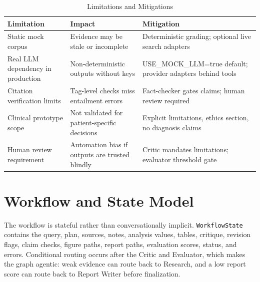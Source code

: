 \documentclass[11pt]{article}
\begin{document}
\begin{table}[!htbp]
\centering
\caption{Limitations and Mitigations}
\label{tab:state-table-5}
\begingroup
\footnotesize
\setlength{\tabcolsep}{2.8pt}
\renewcommand{\arraystretch}{1.35}
\begin{adjustbox}{max width=\textwidth}
\begin{tabularx}{\textwidth}{@{}>{\RaggedRight\arraybackslash}p{}>{\RaggedRight\arraybackslash}p{}Y@{}}
\toprule
\textbf{Limitation} & \textbf{Impact} & \textbf{Mitigation} \\
\midrule
Static mock corpus & Evidence may be stale or incomplete & Deterministic grading; optional live search adapters \\
Real LLM dependency in production & Non-deterministic outputs without keys & USE\_MOCK\_LLM=true default; provider adapters behind tools \\
Citation verification limits & Tag-level checks miss entailment errors & Fact-checker gates claims; human review required \\
Clinical prototype scope & Not validated for patient-specific decisions & Explicit limitations, ethics section, no diagnosis claims \\
Human review requirement & Automation bias if outputs are trusted blindly & Critic mandates limitations; evaluator threshold gate \\
\bottomrule
\end{tabularx}
\end{adjustbox}
\endgroup
\end{table}
\FloatBarrier


\section{Workflow and State Model}
The workflow is stateful rather than conversationally implicit. \texttt{WorkflowState} contains the query, plan, sources, notes, analysis values, tables, critique, revision flags, claim checks, figure paths, report paths, evaluation scores, status, and errors. Conditional routing occurs after the Critic and Evaluator, which makes the graph agentic: weak evidence can route back to Research, and a low report score can route back to Report Writer before finalization.
\end{document}
